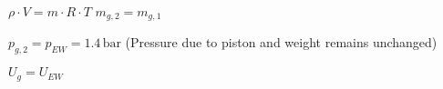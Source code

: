 \( \rho \cdot V = m \cdot R \cdot T \)  
\( m_{g,2} = m_{g,1} \)  

\( p_{g,2} = p_{EW} = 1.4 \, \text{bar} \) (Pressure due to piston and weight remains unchanged)  

\( U_g = U_{EW} \)